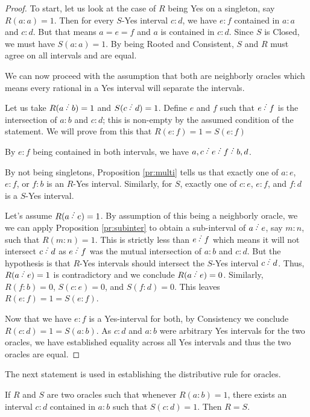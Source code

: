 \documentclass[12pt]{article}
\begin{document}
\begin{proof}
To start, let us look at the case of $R$ being Yes on a singleton, say $R(a:a) = 1$. Then for every $S$-Yes interval $c:d$, we have $e:f$ contained in $a:a$ and $c:d$. But that means $a=e=f$ and $a$ is contained in $c:d$. Since $S$ is Closed, we must have $S(a:a)=1$. By being Rooted and Consistent, $S$ and $R$ must agree on all intervals and are equal. 

We can now proceed with the assumption that both are neighborly oracles which means every rational in a Yes interval will separate the intervals. 

Let us take $R(a \lte b) = 1$ and $S(c \lte d) = 1$. Define $e$ and $f$ such that $e \lte f$ is the intersection of $a:b$ and $c:d$; this is non-empty by the assumed condition of the statement. We will prove from this that $R(e:f)=1 = S(e:f)$

By $e:f$ being contained in both intervals, we have $a,c \lte e \lte f \lte b,d$.

By not being singletons, Proposition \ref{pr:multi} tells us that exactly one of $a:e$, $e:f$, or $f:b$ is an $R$-Yes interval. Similarly, for $S$, exactly one of $c:e$, $e:f$, and $f:d$ is a $S$-Yes interval. 

Let's assume $R(a \lte e) = 1$. By assumption of this being a neighborly oracle, we we can apply Proposition \ref{pr:subinter} to obtain a sub-interval of $a \lte e$, say $m:n$, such that $R(m:n) = 1$. This is strictly less than $e \lte f$ which means it will not intersect $c \lte d$ as $e \lte f$ was the mutual intersection of $a:b$ and $c:d$. But the hypothesis is that $R$-Yes intervals should intersect the $S$-Yes interval $c \lte d$. Thus, $R(a \lte e) = 1$ is contradictory and we conclude $R(a \lte e) = 0$. Similarly, $R(f:b) = 0$, $S(c:e) = 0$, and $S(f:d) = 0$. This leaves $R(e:f) = 1 = S(e:f)$.

 Now that we have $e:f$ is a Yes-interval for both, by Consistency we conclude $R(c:d) = 1 = S(a:b)$. As $c:d$ and $a:b$ were arbitrary Yes intervals for the two oracles, we have established equality across all Yes intervals and thus the two oracles are equal. 

\end{proof}

The next statement is used in establishing the distributive rule for oracles. 

\begin{corollary}
    If $R$ and $S$ are two oracles such that whenever $R(a:b) = 1$, there exists an interval $c:d$ contained in $a:b$ such that $S(c:d) = 1$. Then $R=S$.
\end{corollary}
\end{document}
